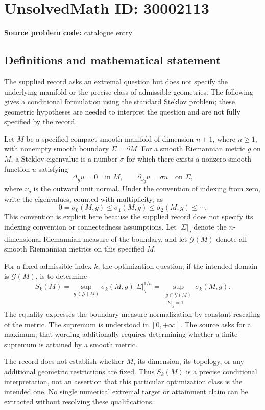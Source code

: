 \documentclass[11pt]{article}
\begin{document}
\section*{UnsolvedMath ID: 30002113}
\textbf{Source problem code:} catalogue entry
\subsection{Definitions and mathematical statement}
The supplied record asks an extremal question but does not specify the underlying manifold or the precise class of admissible geometries. The following gives a conditional formulation using the standard Steklov problem; these geometric hypotheses are needed to interpret the question and are not fully specified by the record.

Let \(M\) be a specified compact smooth manifold of dimension \(n+1\), where \(n\geq 1\), with nonempty smooth boundary \(\Sigma=\partial M\). For a smooth Riemannian metric \(g\) on \(M\), a Steklov eigenvalue is a number \(\sigma\) for which there exists a nonzero smooth function \(u\) satisfying
\[
\Delta_g u=0\quad\text{in }M,\qquad
\partial_{\nu_g}u=\sigma u\quad\text{on }\Sigma,
\]
where \(\nu_g\) is the outward unit normal. Under the convention of indexing from zero, write the eigenvalues, counted with multiplicity, as
\[
0=\sigma_0(M,g)\leq\sigma_1(M,g)\leq\sigma_2(M,g)\leq\cdots.
\]
This convention is explicit here because the supplied record does not specify its indexing convention or connectedness assumptions. Let \(|\Sigma|_g\) denote the \(n\)-dimensional Riemannian measure of the boundary, and let \(\mathcal G(M)\) denote all smooth Riemannian metrics on this specified \(M\).

For a fixed admissible index \(k\), the optimization question, if the intended domain is \(\mathcal G(M)\), is to determine
\[
S_k(M)=\sup_{g\in\mathcal G(M)}
\sigma_k(M,g)|\Sigma|_g^{1/n}
=\sup_{\substack{g\in\mathcal G(M)\\|\Sigma|_g=1}}
\sigma_k(M,g).
\]
The equality expresses the boundary-measure normalization by constant rescaling of the metric. The supremum is understood in \([0,+\infty]\). The source asks for a maximum; that wording additionally requires determining whether a finite supremum is attained by a smooth metric.

The record does not establish whether \(M\), its dimension, its topology, or any additional geometric restrictions are fixed. Thus \(S_k(M)\) is a precise conditional interpretation, not an assertion that this particular optimization class is the intended one. No single numerical extremal target or attainment claim can be extracted without resolving these qualifications.
\end{document}
